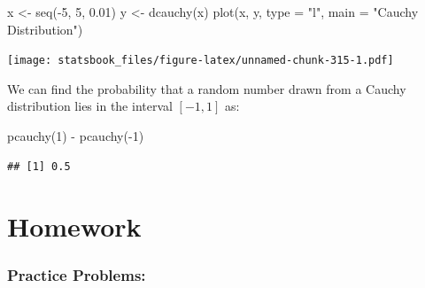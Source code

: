 \documentclass[
]{book}
\newenvironment{Shaded}{\begin{snugshade}}{\end{snugshade}}
\newcommand{\AttributeTok}[1]{\textcolor[rgb]{0.77,0.63,0.00}{#1}}
\newcommand{\DecValTok}[1]{\textcolor[rgb]{0.00,0.00,0.81}{#1}}
\newcommand{\FloatTok}[1]{\textcolor[rgb]{0.00,0.00,0.81}{#1}}
\newcommand{\FunctionTok}[1]{\textcolor[rgb]{0.00,0.00,0.00}{#1}}
\newcommand{\NormalTok}[1]{#1}
\newcommand{\OtherTok}[1]{\textcolor[rgb]{0.56,0.35,0.01}{#1}}
\newcommand{\SpecialCharTok}[1]{\textcolor[rgb]{0.00,0.00,0.00}{#1}}
\newcommand{\StringTok}[1]{\textcolor[rgb]{0.31,0.60,0.02}{#1}}
\theoremstyle{definition}
\theoremstyle{definition}
\theoremstyle{definition}
\theoremstyle{definition}
\theoremstyle{remark}
\begin{document}
\begin{Shaded}
\begin{Highlighting}[]
\NormalTok{x }\OtherTok{\textless{}{-}} \FunctionTok{seq}\NormalTok{(}\SpecialCharTok{{-}}\DecValTok{5}\NormalTok{, }\DecValTok{5}\NormalTok{, }\FloatTok{0.01}\NormalTok{)}
\NormalTok{y }\OtherTok{\textless{}{-}} \FunctionTok{dcauchy}\NormalTok{(x)}
\FunctionTok{plot}\NormalTok{(x, y, }\AttributeTok{type =} \StringTok{"l"}\NormalTok{, }\AttributeTok{main =} \StringTok{"Cauchy Distribution"}\NormalTok{)}
\end{Highlighting}
\end{Shaded}

\texttt{[image: statsbook\_files/figure-latex/unnamed-chunk-315-1.pdf]}

We can find the probability that a random number drawn from a Cauchy distribution lies in the interval \([-1,1]\) as:

\begin{Shaded}
\begin{Highlighting}[]
\FunctionTok{pcauchy}\NormalTok{(}\DecValTok{1}\NormalTok{) }\SpecialCharTok{{-}} \FunctionTok{pcauchy}\NormalTok{(}\SpecialCharTok{{-}}\DecValTok{1}\NormalTok{)}
\end{Highlighting}
\end{Shaded}

\begin{verbatim}
## [1] 0.5
\end{verbatim}

\hypertarget{homework-6}{%
\section{Homework}\label{homework-6}}

\hypertarget{practice-problems-6}{%
\subsubsection{Practice Problems:}\label{practice-problems-6}}
\end{document}
